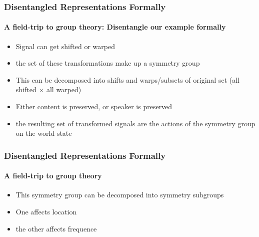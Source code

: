 \documentclass[9pt]{beamer}
\begin{document}
\begin{frame}
\frametitle{Disentangled Representations Formally}
\framesubtitle{A field-trip to group theory: Disentangle our example formally}
\begin{itemize}%
	\item Signal can get shifted or warped
	\item the set of these transformations make up a symmetry group
	\item This can be decomposed into shifts and warps/subsets of original set (all shifted $\times$ all warped)
	\item Either content is preserved, or speaker is preserved
	\item the resulting set of transformed signals are the actions of the symmetry group on the world state
\end{itemize}
\end{frame} 




\begin{frame}
\frametitle{Disentangled Representations Formally}
\framesubtitle{A field-trip to group theory}
\begin{itemize}%
	\item This symmetry group can be decomposed into symmetry subgroups
	\item One affects location
	\item the other affects frequence
\end{itemize}
\end{frame} 
\end{document}
